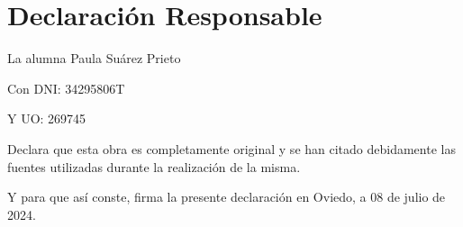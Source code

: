 \documentclass[11pt]{report} %
\renewcommand{\chaptermark}[1]{\markboth{\scriptsize\MakeUppercase{#1}}{}} %
\renewcommand{\sectionmark}[1]{\markright{\tiny\MakeUppercase{#1}}{}} %
\renewcommand{\footrulewidth}{0.4pt}
\begin{document}
\chapter*{Declaración Responsable}
La alumna Paula Suárez Prieto

Con DNI: 34295806T

Y UO: 269745

Declara que esta obra es completamente original y
se han citado debidamente las fuentes utilizadas durante la realización de la misma.

Y para que así conste, firma la presente declaración en Oviedo, a 08 de julio de 2024.




\pagestyle{fancy}

\renewcommand{\chaptermark}[1]{ 
    \markboth{\scriptsize\MakeUppercase{#1}}{} 
}

\renewcommand{\sectionmark}[1]{ 
    \markright{\tiny\MakeUppercase{#1}}{} 
}



\fancyfoot{}

\setlength{\footskip}{32.93277pt}
\renewcommand{\footrulewidth}{0.4pt}


\pagestyle{plain}


\setcounter{tocdepth}{2}
\setcounter{secnumdepth}{4}

\pagestyle{plain}
{
  \hypersetup{hidelinks}
  \renewcommand{\thispagestyle}[1]{}
  \tableofcontents
}
\clearpage

\newpage
{
  \hypersetup{hidelinks}
  \renewcommand{\thispagestyle}[1]{}
  \listoffigures
}
\clearpage
\end{document}

